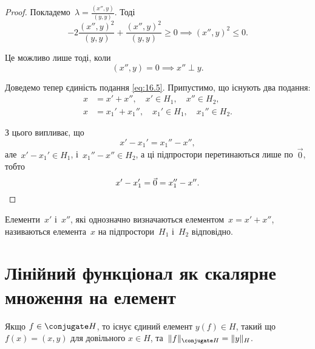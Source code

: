 \begin{proof}
Покладемо~$\lambda = \frac{(x'', y)}{(y, y)}$. Тоді
\begin{equation*}
    - 2\frac{(x'', y)^2}{(y, y)} + \frac{(x'', y)^2}{(y, y)} \ge 0 \implies
    (x'', y)^2 \le 0.
\end{equation*}

Це можливо лише тоді, коли
\begin{equation*}
    (x'', y) = 0 \implies x'' \perp y.
\end{equation*}

Доведемо тепер єдиність подання \eqref{eq:16.5}. Припустимо, що
існують два подання:
\begin{align*}
    x &= x' + x'', \quad x' \in H_1, \quad x'' \in H_2, \\
    x &= x_1' + x_1'', \quad x_1' \in H_1, \quad x_1'' \in H_2.
\end{align*}

З цього випливає, що
\begin{equation*}
    x' - x_1' = x_1'' - x'',
\end{equation*}
але~$x' - x_1' \in H_1$, і~$x_1'' - x'' \in H_2$,
а ці підпростори перетинаються лише по~$\vec 0$, тобто
\begin{equation*}
    x' - x_1' = \vec 0 = x_1'' - x''. \qedhere
\end{equation*}
\end{proof}

\begin{definition}
Елементи~$x'$ і~$x''$, які однозначно
визначаються елементом~$x = x' + x''$, називаються
 елемента~$x$ на підпростори~$H_1$ і~$H_2$
відповідно.
\end{definition}

\section{Лінійний функціонал як скалярне множення на елемент}

\begin{theorem}[Рісса] Якщо
$f \in \conjugate H$, то існує єдиний елемент
$y(f) \in H$, такий що~$f(x) = (x, y)$ для довільного
$x \in H$, та~$\|f\|_{\conjugate H} = \|y\|_H$.
\end{theorem}

